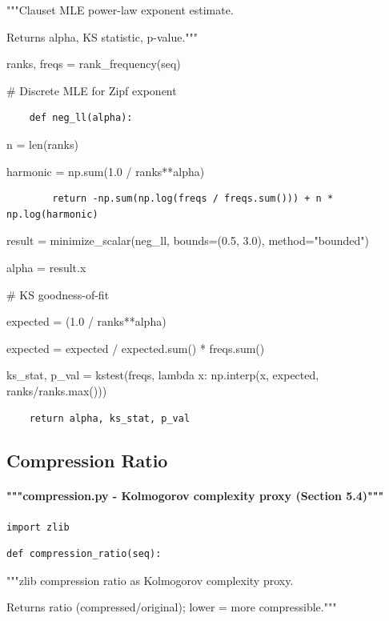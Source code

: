 \documentclass[11pt,letterpaper]{article}
\begin{document}
    """Clauset MLE power-law exponent estimate.


    Returns alpha, KS statistic, p-value."""


    ranks, freqs = rank\_frequency(seq)


    \# Discrete MLE for Zipf exponent

\begin{lstlisting}
    def neg_ll(alpha):
\end{lstlisting}

        n = len(ranks)


        harmonic = np.sum(1.0 / ranks**alpha)

\begin{lstlisting}
        return -np.sum(np.log(freqs / freqs.sum())) + n * np.log(harmonic)
\end{lstlisting}

    result = minimize\_scalar(neg\_ll, bounds=(0.5, 3.0), method="bounded")


    alpha = result.x


    \# KS goodness-of-fit


    expected = (1.0 / ranks**alpha)


    expected = expected / expected.sum() * freqs.sum()


    ks\_stat, p\_val = kstest(freqs, lambda x: np.interp(x, expected, ranks/ranks.max()))

\begin{lstlisting}
    return alpha, ks_stat, p_val
\end{lstlisting}

\subsection{Compression Ratio}

\paragraph{"""compression.py - Kolmogorov complexity proxy (Section 5.4)"""}

\begin{lstlisting}
import zlib
\end{lstlisting}
\begin{lstlisting}
def compression_ratio(seq):
\end{lstlisting}

    """zlib compression ratio as Kolmogorov complexity proxy.


    Returns ratio (compressed/original); lower = more compressible."""
\end{document}
